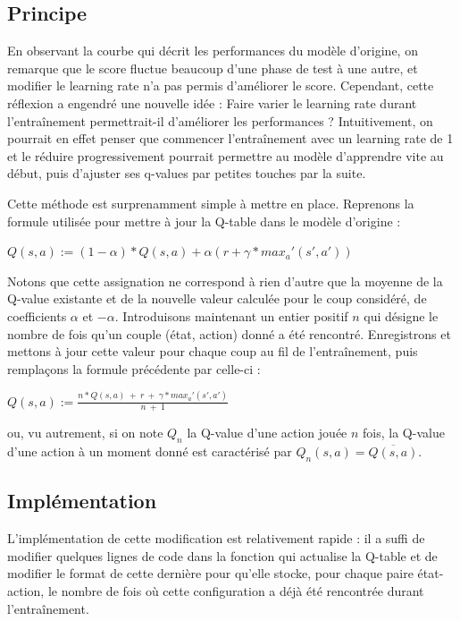\documentclass[french]{article}
\begin{document}
    \subsection{Principe}

    En observant la courbe qui décrit les performances du modèle d'origine, on remarque que le score fluctue beaucoup d'une phase de test à une autre, et modifier le learning rate n'a pas permis d'améliorer le score. Cependant, cette réflexion a engendré une nouvelle idée : Faire varier le learning rate durant l'entraînement permettrait-il d'améliorer les performances ? Intuitivement, on pourrait en effet penser que commencer l'entraînement avec un learning rate de 1 et le réduire progressivement pourrait permettre au modèle d'apprendre vite au début, puis d'ajuster ses q-values par petites touches par la suite.

    Cette méthode est surprenamment simple à mettre en place. Reprenons la formule utilisée pour mettre à jour la Q-table dans le modèle d'origine :

    {\centering $Q(s,a) := (1-\alpha)*Q(s,a) + \alpha(r + \gamma * max_a'(s',a')) $}

    Notons que cette assignation ne correspond à rien d'autre que la moyenne de la Q-value existante et de la nouvelle valeur calculée pour le coup considéré, de coefficients $\alpha$ et $-\alpha$. Introduisons maintenant un entier positif $n$ qui désigne le nombre de fois qu'un couple (état, action) donné a été rencontré. Enregistrons et mettons à jour cette valeur pour chaque coup au fil de l'entraînement, puis remplaçons la formule précédente par celle-ci :
    
    {\centering $Q(s,a) := \frac{n*Q(s,a) \:+ \:r \:+ \:\gamma * max_a'(s',a')}{n\:+\:1}$}

    ou, vu autrement, si on note $Q_n$ la Q-value d'une action jouée $n$ fois, la Q-value d'une action à un moment donné est caractérisé par $Q_n(s,a) = \overline{Q(s,a)}$.

    \subsection{Implémentation}

    L'implémentation de cette modification est relativement rapide : il a suffi de modifier quelques lignes de code dans la fonction qui actualise la Q-table et de modifier le format de cette dernière pour qu'elle stocke, pour chaque paire état-action, le nombre de fois où cette configuration a déjà été rencontrée durant l'entraînement.
\end{document}
